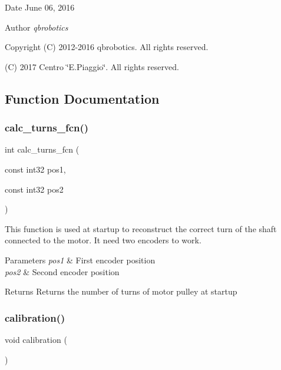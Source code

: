 \begin{DoxyDate}{Date}
June 06, 2016 
\end{DoxyDate}
\begin{DoxyAuthor}{Author}
{\itshape qbrobotics} 
\end{DoxyAuthor}
\begin{DoxyCopyright}{Copyright}
(C) 2012-\/2016 qbrobotics. All rights reserved. 

(C) 2017 Centro \char`\"{}\+E.\+Piaggio\char`\"{}. All rights reserved. 
\end{DoxyCopyright}


\subsection{Function Documentation}
\mbox{\label{utils_8c_afa68f255d25478e463690f63d529c29d}} 
\subsubsection{calc\+\_\+turns\+\_\+fcn()}
{\footnotesize\ttfamily int calc\+\_\+turns\+\_\+fcn (\begin{DoxyParamCaption}\item[{const int32}]{pos1,  }\item[{const int32}]{pos2 }\end{DoxyParamCaption})}

This function is used at startup to reconstruct the correct turn of the shaft connected to the motor. It need two encoders to work.


\begin{DoxyParams}{Parameters}
{\em pos1} & First encoder position \\
\hline
{\em pos2} & Second encoder position\\
\hline
\end{DoxyParams}
\begin{DoxyReturn}{Returns}
Returns the number of turns of motor pulley at startup 
\end{DoxyReturn}
\mbox{\label{utils_8c_a0b6a0b24c6bd8af032a6778166201f7e}} 
\subsubsection{calibration()}
{\footnotesize\ttfamily void calibration (\begin{DoxyParamCaption}{ }\end{DoxyParamCaption})}

